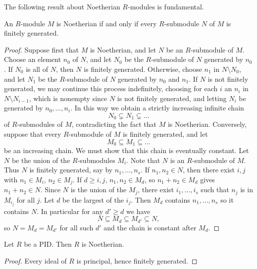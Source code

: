 The following result about Noetherian $ R $-modules is fundamental.

\begin{theorem}
An $ R $-module $ M $ is Noetherian if and only if every $ R $-submodule $ N $ of $ M $ is finitely generated.
\end{theorem}

\begin{proof}
Suppose first that $ M $ is Noetherian, and let $ N $ be an $ R $-submodule of $ M $. Choose an element $ n_0 $ of $ N $, and let $ N_0 $ be the $ R $-submodule of $ N $ generated by $ n_0 $. If $ N_0 $ is all of $ N $, then $ N $ is finitely generated. Otherwise, choose $ n_1 $ in $ N \setminus N_0 $, and let $ N_1 $ be the $ R $-submodule of $ N $ generated by $ n_0 $ and $ n_1 $. If $ N $ is not finitely generated, we may continue this process indefinitely, choosing for each $ i $ an $ n_i $ in $ N \setminus N_{i - 1} $, which is nonempty since $ N $ is not finitely generated, and letting $ N_i $ be generated by $ n_0, \dots, n_i $. In this way we obtain a strictly increasing infinite chain
$$ N_0 \subsetneq N_1 \subsetneq \dots $$
of $ R $-submodules of $ M $, contradicting the fact that $ M $ is Noetherian. Conversely, suppose that every $ R $-submodule of $ M $ is finitely generated, and let
$$ M_0 \subseteq M_1 \subseteq \dots $$
be an increasing chain. We must show that this chain is eventually constant. Let $ N $ be the union of the $ R $-submodules $ M_i $. Note that $ N $ is an $ R $-submodule of $ M $. Thus $ N $ is finitely generated, say by $ n_1, \dots, n_s $. If $ n_1, n_2 \in N $, then there exist $ i, j $ with $ n_1 \in M_i $, $ n_2 \in M_j $. If $ d \ge i, j $, $ n_1, n_2 \in M_d $, so $ n_1 + n_2 \in M_d $ gives $ n_1 + n_2 \in N $. Since $ N $ is the union of the $ M_j $, there exist $ i_1, \dots, i_s $ such that $ n_j $ is in $ M_{i_j} $ for all $ j $. Let $ d $ be the largest of the $ i_j $. Then $ M_d $ contains $ n_1, \dots, n_s $ so it contains $ N $. In particular for any $ d' \ge d $ we have
$$ N \subseteq M_d \subseteq M_{d'} \subseteq N, $$
so $ N = M_d = M_{d'} $ for all such $ d' $ and the chain is constant after $ M_d $.
\end{proof}


\begin{corollary}
Let $ R $ be a PID. Then $ R $ is Noetherian.
\end{corollary}

\begin{proof}
Every ideal of $ R $ is principal, hence finitely generated.
\end{proof}

